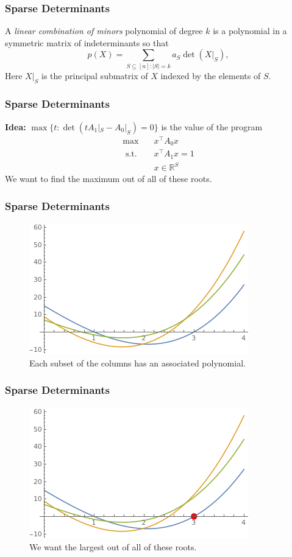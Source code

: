 \documentclass{beamer}
\newcommand{\R}{\mathbb{R}}
\newcommand{\st}{{\text{ s.t. }}}
\begin{document}
\begin{frame}
    \frametitle{Sparse Determinants}
    A \emph{linear combination of minors} polynomial of degree $k$ is a polynomial in a symmetric matrix of indeterminants so that
    \[
        p(X) = \sum_{S \subseteq [n] : |S| = k}a_S\det(X|_S),
    \]
    Here $X|_S$ is the principal submatrix of $X$ indexed by the elements of $S$.
\end{frame}
\begin{frame}
    \frametitle{Sparse Determinants}
    \textbf{Idea:} $\max \{t : \det(tA_1|_S - A_0|_S) = 0\}$ is the value of the program
    \begin{equation*}
        \begin{aligned}
            \max\quad & x^{\intercal}A_0x\\
            \st & x^{\intercal}A_1x = 1\\
                &x \in \R^S
        \end{aligned}
    \end{equation*}
    We want to find the maximum out of all of these roots.
\end{frame}
\begin{frame}
    \frametitle{Sparse Determinants}
    \begin{figure}[h]
        \centering
        \includegraphics[width=0.6\linewidth]{univariates.png}
        \caption{Each subset of the columns has an associated polynomial.}%
        \label{fig:variety}
    \end{figure}
\end{frame}
\begin{frame}
    \frametitle{Sparse Determinants}
    \begin{figure}[h]
        \centering
        \includegraphics[width=0.6\linewidth]{univariates_root.png}
        \caption{We want the largest out of all of these roots.}%
        \label{fig:variety}
    \end{figure}
\end{frame}
\end{document}
